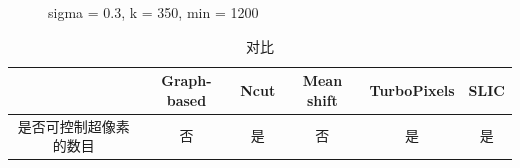 \documentclass[12pt]{article}
\begin{document}
\begin{figure}
  \centering 
  \label{fig: GB} %
  \caption{sigma = 0.3, k = 350, min = 1200}
\end{figure}

\begin{table}[!htp] %
\label{tab: 1}
\centering
\begin{tabular}{|c|c|c|c|c|c|}
\hline
$\quad$ & Graph-based & Ncut & Mean shift & TurboPixels & SLIC \\
\hline
是否可控制超像素的数目&否&是&否&是&是\\
\hline
\end{tabular}  
\caption{对比}
\end{table}





\end{document}

